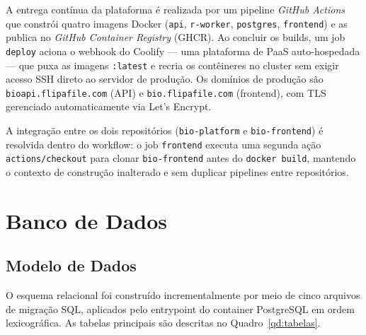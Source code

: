 A entrega contínua da plataforma é realizada por um pipeline
\textit{GitHub Actions} que constrói quatro imagens Docker
(\texttt{api}, \texttt{r-worker}, \texttt{postgres}, \texttt{frontend})
e as publica no \textit{GitHub Container Registry} (GHCR). Ao concluir
os builds, um job \texttt{deploy} aciona o webhook do Coolify — uma
plataforma de PaaS auto-hospedada — que puxa as imagens \texttt{:latest}
e recria os contêineres no cluster sem exigir acesso SSH direto ao
servidor de produção. Os domínios de produção são
\texttt{bioapi.flipafile.com} (API) e \texttt{bio.flipafile.com}
(frontend), com TLS gerenciado automaticamente via Let's Encrypt.

A integração entre os dois repositórios (\texttt{bio-platform} e
\texttt{bio-frontend}) é resolvida dentro do workflow: o job
\texttt{frontend} executa uma segunda ação \texttt{actions/checkout}
para clonar \texttt{bio-frontend} antes do \texttt{docker build},
mantendo o contexto de construção inalterado e sem duplicar pipelines
entre repositórios.

\section{Banco de Dados}

\subsection{Modelo de Dados}

O esquema relacional foi construído incrementalmente por meio de cinco
arquivos de migração SQL, aplicados pelo entrypoint do container
PostgreSQL em ordem lexicográfica. As tabelas principais são
descritas no Quadro~\ref{qd:tabelas}.

